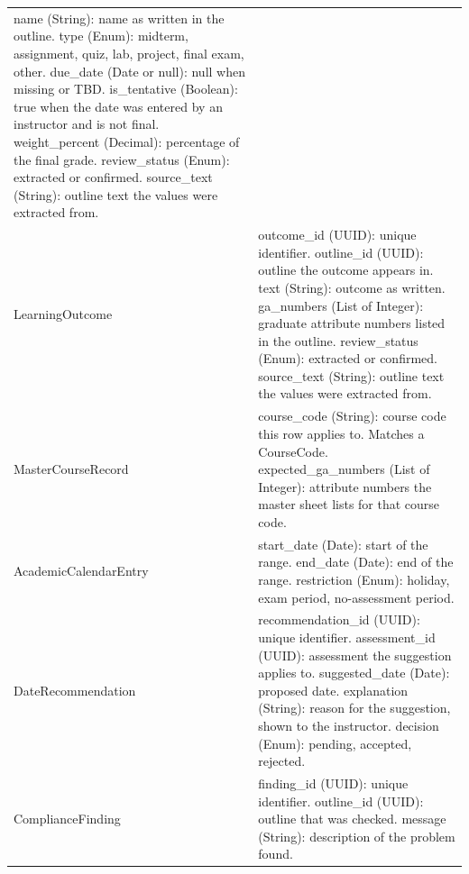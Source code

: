 \documentclass[12pt]{article}
\begin{document}
{\begin{longtable}{>{\raggedright\arraybackslash}p{} >{\raggedright\arraybackslash}p{}}
name (String): name as written in the outline. \newline
type (Enum): midterm, assignment, quiz, lab, project, final exam, other. \newline
due\_date (Date or null): null when missing or TBD. \newline
is\_tentative (Boolean): true when the date was entered by an instructor and is not final. \newline
weight\_percent (Decimal): percentage of the final grade. \newline
review\_status (Enum): extracted or confirmed. \newline
source\_text (String): outline text the values were extracted from. \\ \addlinespace
LearningOutcome &
outcome\_id (UUID): unique identifier. \newline
outline\_id (UUID): outline the outcome appears in. \newline
text (String): outcome as written. \newline
ga\_numbers (List of Integer): graduate attribute numbers listed in the outline. \newline
review\_status (Enum): extracted or confirmed. \newline
source\_text (String): outline text the values were extracted from. \\ \addlinespace
MasterCourseRecord &
course\_code (String): course code this row applies to. Matches a CourseCode. \newline
expected\_ga\_numbers (List of Integer): attribute numbers the master sheet lists for that course code. \\ \addlinespace
AcademicCalendarEntry &
start\_date (Date): start of the range. \newline
end\_date (Date): end of the range. \newline
restriction (Enum): holiday, exam period, no-assessment period. \\ \addlinespace
DateRecommendation &
recommendation\_id (UUID): unique identifier. \newline
assessment\_id (UUID): assessment the suggestion applies to. \newline
suggested\_date (Date): proposed date. \newline
explanation (String): reason for the suggestion, shown to the instructor. \newline
decision (Enum): pending, accepted, rejected. \\ \addlinespace
ComplianceFinding &
finding\_id (UUID): unique identifier. \newline
outline\_id (UUID): outline that was checked. \newline
message (String): description of the problem found. \\
\end{longtable}
}
\end{document}
